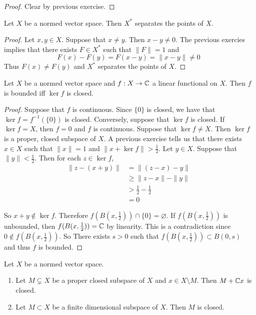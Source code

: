 \documentclass{book}
\begin{document}
	\begin{proof}
	Clear by previous exercise.
\end{proof}		
		
	\begin{ex} 
		Let $X$ be a normed vector space. Then $X^*$ separates the points of $X$. 
	\end{ex}
	
	\begin{proof}
		Let $x, y \in X$. Suppose that $x \neq y$. Then $x-y \neq 0$. The previous exercies implies that there exists $F \in X^*$ such that $\|F \|= 1$ and $$F(x) - F(y) = F(x-y) = \|x-y \|\neq 0$$ Thus $F(x) \neq F(y)$ and $X^*$ separates the points of $X$.
	\end{proof}
	
	
	\begin{ex} 
		Let $X$ be a normed vector space and $f:X \rightarrow \mathbb{C}$ a linear functional on $X$. Then $f$ is bounded iff $\ker f$ is closed. 
	\end{ex}
	
	\begin{proof}
		Suppose that $f$ is continuous. Since $\{0\}$ is closed, we have that $\ker f = f^{-1}(\{0\})$ is closed. Conversely, suppose that $\ker f$ is closed. If $\ker f = X$, then $f =0$ and $f$ is continuous. Suppose that $\ker f \neq X$. Then $\ker f$ is a proper, closed subspace of $X$. A previous exercise tells us that there exists $x \in X$ such that $\|x \|= 1$ and $\|x + \ker f \|> \frac{1}{2}$. Let $y \in X$. Suppose that $\|y \|< \frac{1}{2}$. Then for each $z \in \ker f$, 
		\begin{align*}
			\|z -  (x+y)\|
			& = \|(z-x) -y \|\\
			& \geq \|z-x \|- \|y \|\\
			& > \frac{1}{2} - \frac{1}{2} \\
			&=0
		\end{align*}
		
		So $x+y \not \in \ker f$. Therefore $f(B(x,\frac{1}{2})) \cap \{0\} = \varnothing$. If $f(B(x,\frac{1}{2})) $ is unbounded, then $f(B(x,\frac{1}{2})) = \mathbb{C}$ by linearity. This is a contradiction since $0 \not \in f(B(x,\frac{1}{2}))$. So There exists $s > 0$ such that $f(B(x,\frac{1}{2})) \subset B(0,s)$ and thus $f$ is bounded. 
	\end{proof}
	
	\begin{ex} 
		Let $X$ be a normed vector space. 
		\begin{enumerate}
			\item Let $M \subsetneq X$ be a proper closed subspace of $X$ and $x \in X \setminus M$. Then $M + \mathbb{C} x$ is closed.
			\item Let $M \subset X$ be a finite dimensional subspace of $X$. Then $M$ is closed.
		\end{enumerate}
	\end{ex}
	
\end{document}
